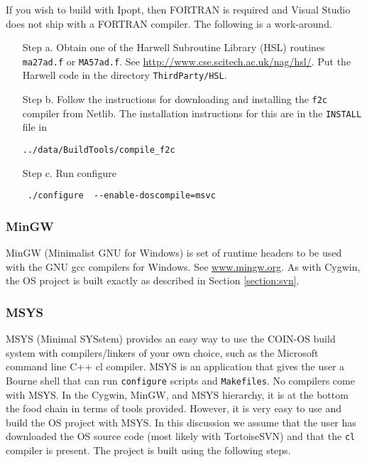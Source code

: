 \documentclass[11pt]{article}
\renewcommand{\_}{{\char"5F}}
\renewcommand{\{}{{\char"7B}}
\renewcommand{\}}{{\char"7D}}
\renewcommand{\^}{{\char"0D}}
\renewcommand{\'}{{\char"0D}}
\begin{document}
\begin{itemize}
If you wish to build with Ipopt, then FORTRAN is required and Visual Studio does not ship with a FORTRAN compiler. The following is a work-around.

\begin{itemize}

\item[Step a.]  Obtain one of the   Harwell Subroutine Library (HSL) routines {\tt ma27ad.f} or {\tt MA57ad.f}.  See \url{http://www.cse.scitech.ac.uk/nag/hsl/}.  Put the Harwell code in the directory {\tt ThirdParty/HSL}.




\item[Step b.]  Follow the instructions for downloading and installing the {\tt f2c} compiler from Netlib.  The installation instructions for this are in the {\tt INSTALL} file in
\begin{verbatim}
../data/BuildTools/compile_f2c
\end{verbatim}



\item[Step c.]  Run configure

\begin{verbatim}
 ./configure  --enable-doscompile=msvc
 \end{verbatim}


\end{itemize}


\end{itemize}

\subsubsection{MinGW}



MinGW (Minimalist GNU for Windows) is set of runtime headers to be used with the GNU gcc compilers for Windows.  See \url{www.mingw.org}. As with Cygwin, the OS project is  built exactly as described in Section \ref{section:svn}.

\subsubsection{MSYS}



MSYS (Minimal SYSstem) provides an easy way to use the COIN-OS build system with compilers/linkers of your own choice, such as the Microsoft command line C++ cl compiler.  MSYS is an application that gives the user a Bourne shell that can run {\tt configure}  scripts and {\tt Makefiles}.  No compilers come with MSYS. In the Cygwin, MinGW, and MSYS hierarchy, it is at the bottom the food chain in terms of tools provided. However, it is very easy to use and build the OS project with MSYS.    In this discussion we assume that the user has downloaded the OS source code (most likely  with TortoiseSVN) and that the {\tt cl} compiler is present.  The project is built using the following steps.
\end{document}
